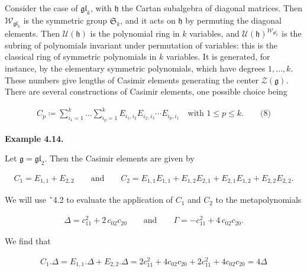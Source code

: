 \documentclass[10pt,a4paper]{article}
\begin{document}
Consider the case of $\mathfrak{gl}_{k}$, with $\mathfrak{h}$ the Cartan subalgebra of diagonal matrices. Then $\mathcal{W}_{\mathfrak{gl}_{k}}$ is the symmetric group $\mathfrak{S}_{k}$, and it acts on $\mathfrak{h}$ by permuting the diagonal elements. Then $\mathcal{U}(\mathfrak{h})$ is the polynomial ring in $k$ variables, and $\mathcal{U}(\mathfrak{h})^{\mathcal{W}_{\mathfrak{gl}_{k}}}$ is the subring of polynomials invariant under permutation of variables: this is the classical ring of symmetric polynomials in $k$ variables. It is generated, for instance, by the elementary symmetric polynomials, which have degrees $1,\ldots,k$. These numbers give lengths of Casimir elements generating the center $\mathcal{Z}(\mathfrak{g})$.
There are several constructions of Casimir elements, one possible choice being



\[\begin{aligned}
\displaystyle C_{p}\coloneqq\sum_{i_{1}=1}^{k}\dots\sum_{i_{p}=1}^{k}E_{i_{1},i_{2}}E_{i_{2},i_{3}}\cdots E_{i_{p},i_{1}}\quad\text{with }1\leq p\leq k.\qquad\text{(8)}
\end{aligned}\]




\par\medskip\noindent\textbf{Example 4.14.}\par



Let $\mathfrak{g}=\mathfrak{gl}_{2}$. Then the Casimir elements are given by



\[\begin{aligned}
\displaystyle C_{1}=E_{1,1}+E_{2,2}\qquad\text{and}\qquad C_{2}=E_{1,1}E_{1,1}+E_{1,2}E_{2,1}+E_{2,1}E_{1,2}+E_{2,2}E_{2,2}.
\end{aligned}\]


We will use ˜4.2 to evaluate the application of $C_{1}$ and $C_{2}$ to the metapolynomials



\[\begin{aligned}
\displaystyle\Delta=c_{11}^{2}+2\,c_{02}c_{20}\qquad\text{and}\qquad\Gamma=-c_{11}^{2}+4\,c_{02}c_{20}.
\end{aligned}\]


We find that



\[\begin{aligned}
\displaystyle C_{1}.\Delta=E_{1,1}.\Delta+E_{2,2}.\Delta=2c_{11}^{2}+4c_{02}c_{20}+2c_{11}^{2}+4c_{02}c_{20}=4\Delta
\end{aligned}\]
\end{document}
